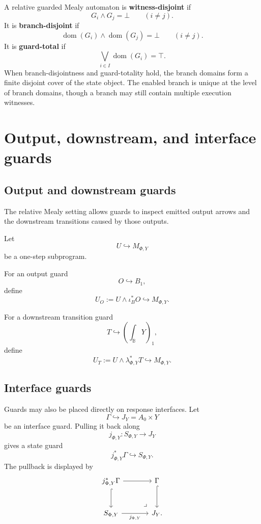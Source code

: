 A relative guarded Mealy automaton is \textbf{witness-disjoint} if
\[
G_i\wedge G_j=\bot
\qquad
(i\ne j).
\]
It is \textbf{branch-disjoint} if
\[
\operatorname{dom}(G_i)\wedge\operatorname{dom}(G_j)=\bot
\qquad
(i\ne j).
\]
It is \textbf{guard-total} if
\[
\bigvee_{i\in I}\operatorname{dom}(G_i)=\top.
\]
When branch-disjointness and guard-totality hold, the branch domains form a
finite disjoint cover of the state object.  The enabled branch is unique at
the level of branch domains, though a branch may still contain multiple
execution witnesses.

\section{Output, downstream, and interface guards}
\label{sec:poly-relative-output-downstream-interface-guards}

\subsection{Output and downstream guards}
\label{subsec:poly-relative-output-downstream-guards}

The relative Mealy setting allows guards to inspect emitted output arrows and
the downstream transitions caused by those outputs.

Let
\[
U\hookrightarrow M_{\Phi,Y}
\]
be a one-step subprogram.

For an output guard
\[
O\hookrightarrow B_1,
\]
define
\[
U_O:=U\wedge\iota_B^\ast O\hookrightarrow M_{\Phi,Y}.
\]

For a downstream transition guard
\[
T\hookrightarrow\left(\int_{\mathbb B}Y\right)_1,
\]
define
\[
U_T:=U\wedge\lambda_{\Phi,Y}^\ast T\hookrightarrow M_{\Phi,Y}.
\]

\subsection{Interface guards}
\label{subsec:poly-relative-interface-guards}

Guards may also be placed directly on response interfaces.  Let
\[
\Gamma\hookrightarrow J_Y=A_0\times Y
\]
be an interface guard.  Pulling it back along
\[
j_{\Phi,Y}:S_{\Phi,Y}\to J_Y
\]
gives a state guard
\[
j_{\Phi,Y}^\ast\Gamma\hookrightarrow S_{\Phi,Y}.
\]
The pullback is displayed by
\[
\begin{tikzcd}[column sep=large,row sep=large]
j_{\Phi,Y}^\ast\Gamma
  \arrow[r]
  \arrow[d,hook]
&
\Gamma
  \arrow[d,hook]
\\
S_{\Phi,Y}
  \arrow[r,"j_{\Phi,Y}"']
&
J_Y
\arrow[ul,phantom,very near start,"\lrcorner"] .
\end{tikzcd}
\]

